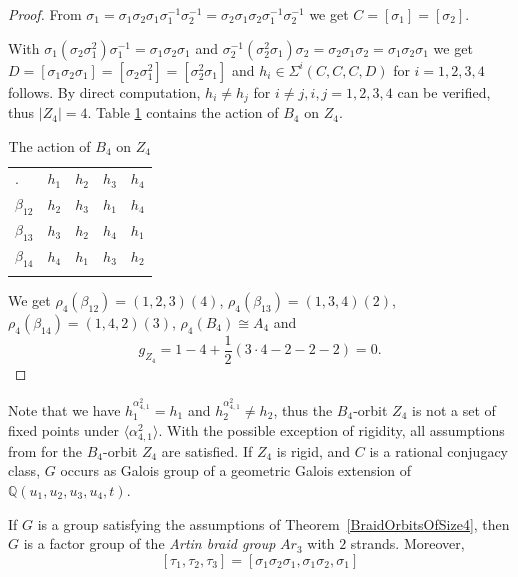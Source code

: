 \documentclass[12pt,a4paper]{article}
\numberwithin{equation}{section}
\numberwithin{table}{section}
\begin{document}
\begin{proof}
From $\sigma_1 = \sigma_1 \sigma_2 \sigma_1 \sigma_1^{-1} \sigma_2^{-1} = 
\sigma_2 \sigma_1 \sigma_2 \sigma_1^{-1} \sigma_2^{-1}$
we get $C = [\sigma_1] = [\sigma_2]$.
\par
\noindent
With $\sigma_1(\sigma_2 \sigma_1^2)\sigma_1^{-1} = \sigma_1 \sigma_2 \sigma_1$
and $\sigma_2^{-1}(\sigma_2^2 \sigma_1)\sigma_2 = \sigma_2 \sigma_1 \sigma_2 = \sigma_1 \sigma_2 \sigma_1$
we get
$D = [\sigma_1 \sigma_2 \sigma_1] = [\sigma_2 \sigma_1^2] = [\sigma_2^2 \sigma_1]$
and $h_i \in \Sigma^i(C,C,C,D)$ for $i=1,2,3,4$ follows.
By direct computation, $h_i \neq h_j$ for $i \neq j, i,j = 1,2,3,4$ can be verified, thus $\vert Z_4 \vert = 4$.
Table \ref{tab:ActionB4OnZ4} contains the action of $B_4$ on $Z_4$.
%
\begin{table}[!htbp]
\centering
\footnotesize
\captionsetup{font=footnotesize}
\caption{The action of $B_4$ on $Z_4$}
\label{tab:ActionB4OnZ4}
\begin{tabular}{lllll}
\hline\noalign{\smallskip}
. & $h_1$ & $h_2$ & $h_3$ & $h_4$ \\
\noalign{\smallskip}\hline\noalign{\smallskip}
$\beta_{12}$ & $h_2$ & $h_3$ & $h_1$ & $h_4$ \\
$\beta_{13}$ & $h_3$ & $h_2$ & $h_4$ & $h_1$ \\
$\beta_{14}$ & $h_4$ & $h_1$ & $h_3$ & $h_2$ \\
\noalign{\smallskip}\hline
\end{tabular}
\end{table}
%
We get $\rho_4(\beta_{12})=(1,2,3)(4)$, $\rho_4(\beta_{13})=(1,3,4)(2)$, $\rho_4(\beta_{14})=(1,4,2)(3)$,
$\rho_4(B_4)\cong A_4$ and
$$g_{Z_4}= 1 - 4 + \frac{1}{2}(3\cdot 4 -2 -2 -2) = 0.$$
\end{proof}
%
\noindent
Note that we have $h_1^{\alpha_{4,1}^2} = h_1$ and $h_2^{\alpha_{4,1}^2} \neq h_2$, thus the $B_4$-orbit $Z_4$ is not
a set of fixed points under $\langle \alpha_{4,1}^2 \rangle$.
With the possible exception of rigidity, all assumptions from \cite[III, Corollary 5.8]{RefMM2018}
for the $B_4$-orbit $Z_4$ are satisfied. If $Z_4$ is rigid, and $C$ is a rational conjugacy class, 
$G$ occurs as Galois group of a geometric Galois extension of $\mathbb{Q}(u_1,u_2,u_3,u_4,t)$.
\par
\noindent
If $G$ is a group satisfying the assumptions of Theorem~\ref{BraidOrbitsOfSize4}, then
$G$ is a factor group of the {\it Artin braid group} $Ar_3$ with $2$ strands.
Moreover,
$$[\tau_1, \tau_2, \tau_3] = [\sigma_1 \sigma_2 \sigma_1, \sigma_1 \sigma_2, \sigma_1]$$
\end{document}
